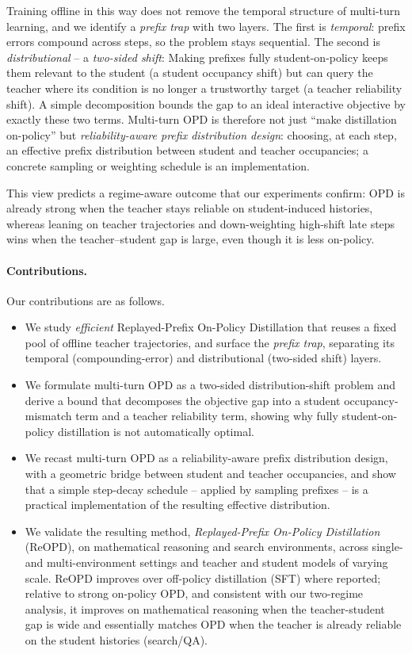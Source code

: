 Training offline in this way does not remove the temporal structure of multi-turn
learning, and we identify a \emph{prefix trap} with two layers. The first is
\emph{temporal}: prefix errors compound across steps, so the problem stays
sequential. The second is \emph{distributional} -- a \emph{two-sided shift}:
Making prefixes fully student-on-policy keeps them relevant to the student (a
student occupancy shift) but can query the teacher where its condition is no
longer a trustworthy target (a teacher reliability shift). A simple decomposition
bounds the gap to an ideal interactive objective by exactly these two terms.
Multi-turn OPD is therefore not just ``make distillation on-policy'' but
\emph{reliability-aware prefix distribution design}: choosing, at each step, an
effective prefix distribution between student and teacher occupancies; a concrete
sampling or weighting schedule is an implementation.

This view predicts a regime-aware outcome that our experiments confirm: OPD is already
strong when the teacher stays reliable on student-induced histories, whereas leaning on teacher trajectories
and down-weighting high-shift late steps wins when the teacher--student gap is large, even though it is less
on-policy.

\paragraph{Contributions.} Our contributions are as follows.
\begin{itemize}[leftmargin=1.5em,itemsep=2pt,topsep=2pt]
  \item We study \emph{efficient} Replayed-Prefix On-Policy Distillation that reuses a
  fixed pool of offline teacher trajectories, and surface the \emph{prefix trap},
  separating its temporal (compounding-error) and distributional (two-sided shift)
  layers.
  \item We formulate multi-turn OPD as a two-sided distribution-shift problem and
  derive a bound that decomposes the objective gap into a student
  occupancy-mismatch term and a teacher reliability term, showing why fully
  student-on-policy distillation is not automatically optimal.
  \item We recast multi-turn OPD as a reliability-aware prefix distribution design, with
  a geometric bridge between student and teacher occupancies, and show that a simple
  step-decay schedule -- applied by sampling prefixes -- is a practical implementation
  of the resulting effective distribution.
  \item We validate the resulting method, \emph{Replayed-Prefix On-Policy Distillation} (ReOPD), on mathematical reasoning and search environments,
  across single- and multi-environment settings and teacher and student models of varying
  scale. ReOPD improves over off-policy distillation (SFT) where reported; relative to
  strong on-policy OPD, and consistent with our two-regime analysis, it improves on
  mathematical reasoning when the teacher-student gap is wide and essentially matches
  OPD when the teacher is already reliable on the student histories (search/QA).
\end{itemize}
